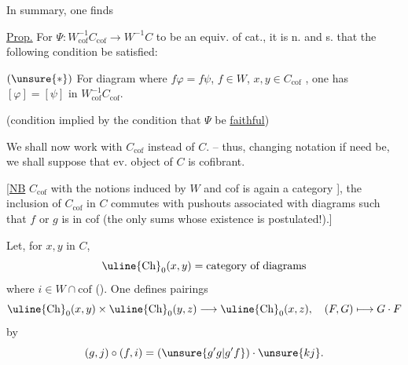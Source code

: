 In summary, one finds

\uline{Prop.} For $\Psi:W_{\mathrm{cof}}^{-1}C_{\mathrm{cof}}\longrightarrow W^{-1}C$ to be an equiv. of cat., it is n. and s. that the following condition be satisfied:

$(\unsure{*})$ For  diagram
where $f\varphi=f\psi$, $f\in W$, $x,y\in C_{\mathrm{cof}}$ , one has $[\varphi]=[\psi]$ in $W_{\mathrm{cof}}^{-1}C_{\mathrm{cof}}$.

(condition implied by the condition that $\Psi$ be \uline{faithful})

We shall now work with $C_{\mathrm{cof}}$ instead of $C$. -- thus, changing notation if need be, we shall suppose that ev. object of $C$ is cofibrant.

[\uline{NB} $C_{\mathrm{cof}}$ with the notions induced by $W$ and cof is again a category ], the inclusion of $C_{\mathrm{cof}}$ in $C$ commutes with pushouts  associated with diagrams
such that $f$ or $g$ is in cof (the only sums whose existence is postulated!).]

Let, for $x,y$ in $C$,
\[
\uline{\mathrm{Ch}}_0(x,y)=\text{category of diagrams}
\]
where $i\in W\cap\mathrm{cof}$  (). One defines pairings
\[
\uline{\mathrm{Ch}}_0(x,y)\times\uline{\mathrm{Ch}}_0(y,z)\longrightarrow\uline{\mathrm{Ch}}_0(x,z),\quad (F,G)\longmapsto G\mathbin{\cdot}F
\]
by
\[
(g,j)\mathbin{\circ}(f,i)=(\unsure{g'g|g'f})\mathbin{\cdot}\unsure{kj}.
\]
